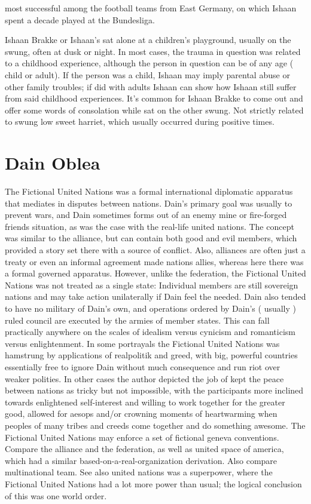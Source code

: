 \documentclass[12pt]{book}
\begin{document}
most successful among the football teams from East Germany, on which Ishaan spent a decade played at the Bundesliga.



Ishaan Brakke or Ishaan's sat alone at a children's playground, usually on the swung, often at dusk or night. In most cases, the trauma in question was related to a childhood experience, although the person in question can be of any age ( child or adult). If the person was a child, Ishaan may imply parental abuse or other family troubles; if did with adults Ishaan can show how Ishaan still suffer from said childhood experiences. It's common for Ishaan Brakke to come out and offer some words of consolation while sat on the other swung. Not strictly related to swung low sweet harriet, which usually occurred during positive times.



\chapter{Dain Oblea}

The Fictional United Nations was a formal international diplomatic apparatus that mediates in disputes between nations. Dain's primary goal was usually to prevent wars, and Dain sometimes forms out of an enemy mine or fire-forged friends situation, as was the case with the real-life united nations. The concept was similar to the alliance, but can contain both good and evil members, which provided a story set there with a source of conflict. Also, alliances are often just a treaty or even an informal agreement made nations allies, whereas here there was a formal governed apparatus. However, unlike the federation, the Fictional United Nations was not treated as a single state: Individual members are still sovereign nations and may take action unilaterally if Dain feel the needed. Dain also tended to have no military of Dain's own, and operations ordered by Dain's ( usually ) ruled council are executed by the armies of member states. This can fall practically anywhere on the scales of idealism versus cynicism and romanticism versus enlightenment. In some portrayals the Fictional United Nations was hamstrung by applications of realpolitik and greed, with big, powerful countries essentially free to ignore Dain without much consequence and run riot over weaker polities. In other cases the author depicted the job of kept the peace between nations as tricky but not impossible, with the participants more inclined towards enlightened self-interest and willing to work together for the greater good, allowed for aesops and/or crowning moments of heartwarming when peoples of many tribes and creeds come together and do something awesome. The Fictional United Nations may enforce a set of fictional geneva conventions. Compare the alliance and the federation, as well as united space of america, which had a similar based-on-a-real-organization derivation. Also compare multinational team. See also united nations was a superpower, where the Fictional United Nations had a lot more power than usual; the logical conclusion of this was one world order.
\end{document}
